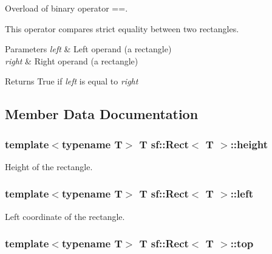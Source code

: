Overload of binary operator ==. 

This operator compares strict equality between two rectangles.


\begin{DoxyParams}{Parameters}
{\em left} & Left operand (a rectangle) \\
\hline
{\em right} & Right operand (a rectangle)\\
\hline
\end{DoxyParams}
\begin{DoxyReturn}{Returns}
True if {\itshape left} is equal to {\itshape right} 
\end{DoxyReturn}


\subsection{Member Data Documentation}
\hypertarget{classsf_1_1_rect_a6fa0fc7de1636d78cae1a1b54eef95cd}{
\subsubsection[{height}]{\setlength{\rightskip}{0pt plus 5cm}template$<$typename T$>$ {\bf T} {\bf sf\-::\-Rect}$<$ {\bf T} $>$\-::height}}\label{classsf_1_1_rect_a6fa0fc7de1636d78cae1a1b54eef95cd}


Height of the rectangle. 

\hypertarget{classsf_1_1_rect_aa49960fa465103d9cb7069ceb25c7c32}{
\subsubsection[{left}]{\setlength{\rightskip}{0pt plus 5cm}template$<$typename T$>$ {\bf T} {\bf sf\-::\-Rect}$<$ {\bf T} $>$\-::left}}\label{classsf_1_1_rect_aa49960fa465103d9cb7069ceb25c7c32}


Left coordinate of the rectangle. 

\hypertarget{classsf_1_1_rect_abd3d3a2d0ad211ef0082bd0aa1a5c0e3}{
\subsubsection[{top}]{\setlength{\rightskip}{0pt plus 5cm}template$<$typename T$>$ {\bf T} {\bf sf\-::\-Rect}$<$ {\bf T} $>$\-::top}}\label{classsf_1_1_rect_abd3d3a2d0ad211ef0082bd0aa1a5c0e3}


